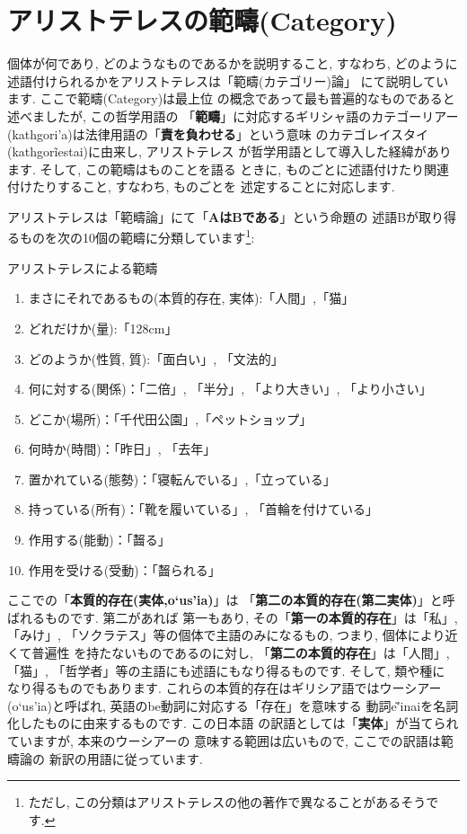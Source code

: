 \section{アリストテレスの範疇(Category)}


個体が何であり, どのようなものであるかを説明すること, すなわち,
 どのように述語付けられるかをアリストテレスは「範疇(カテゴリー)論」
\cite{アリストテレス1}にて説明しています. ここで範疇(Category)は最上位
の概念であって最も普遍的なものであると述べましたが, この哲学用語の
「\textbf{範疇}」に対応するギリシャ語のカテゴーリアー
(\textgreek{kathgori'a})は法律用語の「\textbf{責を負わせる}」という意味
のカテゴレイスタイ(\textgreek{kathgor\~{i}estai})に由来し, アリストテレス
が哲学用語として導入した経緯があります. そして, この範疇はものことを語る
ときに, ものごとに述語付けたり関連付けたりすること, すなわち, ものごとを
述定することに対応します.
\newline


アリストテレスは「範疇論」にて「\textbf{AはBである}」という命題の
述語Bが取り得るものを次の10個の範疇に分類しています\footnote{ただし,
 この分類はアリストテレスの他の著作で異なることがあるそうです.}:


\begin{itembox}[c]{{アリストテレスによる範疇}}
{\footnotesize
\begin{enumerate}
\item{まさにそれであるもの(本質的存在, 実体):「人間」,「猫」}
\item{どれだけか(量):「128cm」}
\item{どのようか(性質, 質):「面白い」, 「文法的」}
\item{何に対する(関係)：「二倍」, 「半分」, 「より大きい」, 「より小さい」}
\item{どこか(場所)：「千代田公園」,「ペットショップ」}
\item{何時か(時間)：「昨日」, 「去年」}
\item{置かれている(態勢)：「寝転んでいる」,「立っている」}
\item{持っている(所有)：「靴を履いている」, 「首輪を付けている」}
\item{作用する(能動)：「齧る」}
\item{作用を受ける(受動)：「齧られる」}
\end{enumerate}
}
\end{itembox}


ここでの「\textbf{本質的存在(実体,\textgreek{o`us'ia})}」は
「\textbf{第二の本質的存在(第二実体)}」と呼ばれるものです. 第二があれば
第一もあり, その「\textbf{第一の本質的存在}」は「私」, 「みけ」,
「ソクラテス」等の個体で主語のみになるもの, つまり, 個体により近くて普遍性
を持たないものであるのに対し, 「\textbf{第二の本質的存在}」は「人間」,
 「猫」, 「哲学者」等の主語にも述語にもなり得るものです. そして, 類や種に
なり得るものでもあります. これらの本質的存在はギリシア語ではウーシアー
(\textgreek{o`us'ia})と呼ばれ, 英語のbe動詞に対応する「存在」を意味する
動詞\textgreek{e\~{'i}nai}を名詞化したものに由来するものです. この日本語
の訳語としては「\textbf{実体}」が当てられていますが, 本来のウーシアーの
意味する範囲は広いもので, ここでの訳語は範疇論\cite{アリストテレス1}の
新訳の用語に従っています.
\newline


